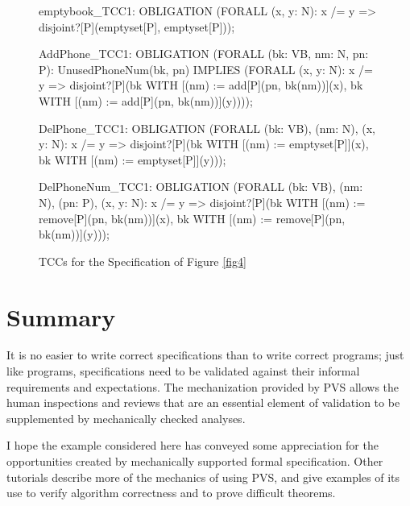 \begin{figure}
\begin{jmrsession}

emptybook_TCC1: OBLIGATION
      (FORALL (x, y: N): x /= y => disjoint?[P](emptyset[P], emptyset[P]));


AddPhone_TCC1: OBLIGATION
      (FORALL (bk: VB, nm: N, pn: P):
         UnusedPhoneNum(bk, pn) IMPLIES
           (FORALL (x, y: N): 
              x /= y =>
                disjoint?[P](bk WITH [(nm) := add[P](pn, bk(nm))](x),
                             bk WITH [(nm) := add[P](pn, bk(nm))](y))));


DelPhone_TCC1: OBLIGATION
      (FORALL (bk: VB), (nm: N), (x, y: N):
         x /= y =>
           disjoint?[P](bk WITH [(nm) := emptyset[P]](x),
                        bk WITH [(nm) := emptyset[P]](y)));


DelPhoneNum_TCC1: OBLIGATION
      (FORALL (bk: VB), (nm: N), (pn: P), (x, y: N):
         x /= y =>
           disjoint?[P](bk WITH [(nm) := remove[P](pn, bk(nm))](x),
                        bk WITH [(nm) := remove[P](pn, bk(nm))](y)));

\end{jmrsession}
\caption{\label{fig4-tccs}TCCs for the Specification of Figure \protect\ref{fig4}}  
\end{figure}

\newpage

\section{Summary}

It is no easier to write correct specifications than to write correct
programs; just like programs, specifications need to be validated
against their informal requirements and expectations.  The
mechanization provided by PVS allows the human inspections and
reviews that are an essential element of validation to be
supplemented by mechanically checked analyses.

I hope the example considered here has conveyed some appreciation for
the opportunities created by mechanically supported formal
specification.  Other tutorials describe more of the mechanics of
using PVS, and give examples of its use to verify algorithm
correctness and to prove difficult theorems.


